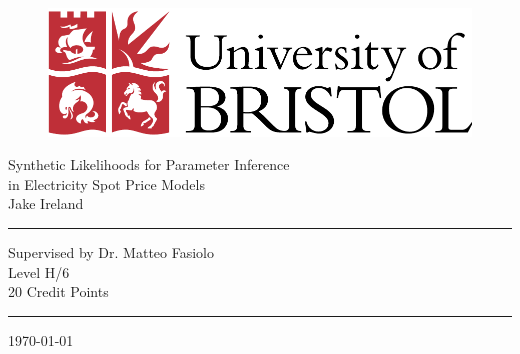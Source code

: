 \documentclass[12pt]{article}
\begin{document}
\thispagestyle{empty}

\begin{singlespacing}
\begin{figure}[h]
\begin{center}
\includegraphics[scale=0.5]{uob.pdf} %
\end{center}
\end{figure}

\begin{center}
{\Large Synthetic Likelihoods for Parameter Inference\\ in Electricity Spot Price Models \\ \vspace{1cm}Jake Ireland}
\end{center}

\vspace{3cm}
\hrule
\vspace{0.3cm}
\begin{center}
Supervised by Dr. Matteo Fasiolo\\
Level H/6\\
20 Credit Points
\end{center}
\vspace{0.5cm}
\hrule

\vspace{3cm}
\begin{center}
\today
\end{center}
\end{singlespacing}
\end{document}
